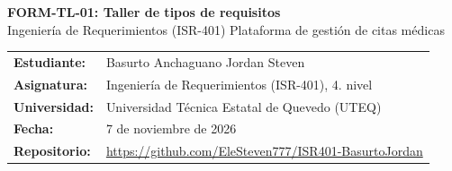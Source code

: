 \documentclass[10pt,letterpaper,landscape]{article}
\begin{document}
{\LARGE\bfseries FORM-TL-01: Taller de tipos de requisitos}\\[2pt]
{\large Ingenier\'ia de Requerimientos (ISR-401) \textperiodcentered{} Plataforma de gesti\'on de citas m\'edicas}

\medskip
\begin{tabular}{@{}ll}
\textbf{Estudiante:} & Basurto Anchaguano Jordan Steven\\
\textbf{Asignatura:} & Ingenier\'ia de Requerimientos (ISR-401), 4.\textordmasculine{} nivel\\
\textbf{Universidad:} & Universidad T\'ecnica Estatal de Quevedo (UTEQ)\\
\textbf{Fecha:} & 7 de noviembre de 2026\\
\textbf{Repositorio:} & \url{https://github.com/EleSteven777/ISR401-BasurtoJordan}\\
\end{tabular}
\end{document}
